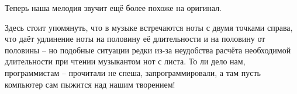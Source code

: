 \documentclass[../sparc.tex]{subfiles}
\begin{document}
Теперь наша мелодия звучит ещё более похоже на оригинал.

Здесь стоит упомянуть, что в музыке встречаются ноты с двумя точками справа, что
даёт удлинение ноты на половину её длительности и на половину от половины -- но
подобные ситуации редки из-за неудобства расчёта необходимой длительности при
чтении музыкантом нот с листа. То ли дело нам, программистам -- прочитали не
спеша, запрограммировали, а там пусть компьютер сам пыжится над нашим творением!
\end{document}
